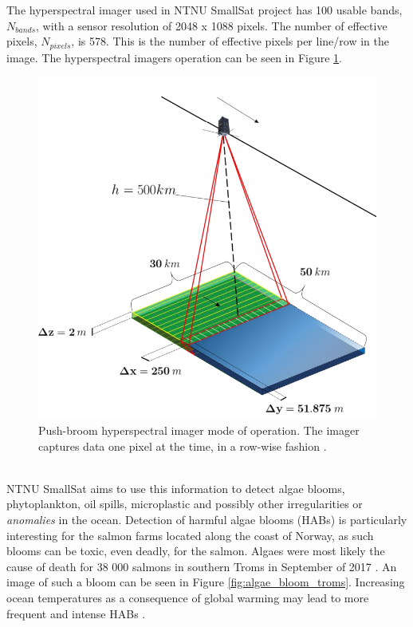 The hyperspectral imager used in NTNU SmallSat project has 100 usable bands, $N_{bands}$, with a sensor resolution of 2048 x 1088 pixels. The number of effective pixels, $N_{pixels}$, is 578. This is the number of effective pixels per line/row in the image. The hyperspectral imagers operation can be seen in Figure \ref{fig:HSI_functionality}. 
\begin{figure}[H]
\centering
   \includegraphics[scale=0.3]{images/hyperspectral_imager.PNG}
  \caption{ Push-broom hyperspectral imager mode of operation. The imager captures data one pixel at the time, in a row-wise fashion \cite{SmallSat_project_description}. } 
  \label{fig:HSI_functionality}
\end{figure}
\\

NTNU SmallSat aims to use this information to detect algae blooms, phytoplankton, oil spills, microplastic and possibly other irregularities or \textit{anomalies} in the ocean. Detection of harmful algae blooms (HABs) is particularly interesting for the salmon farms located along the coast of Norway, as such blooms can be toxic, even deadly, for the salmon. Algaes were most likely the cause of death for 38 000 salmons in southern Troms in September of 2017 \cite{laksedeath}. An image of such a bloom can be seen in Figure \ref{fig:algae_bloom_troms}. Increasing ocean temperatures as a consequence of global warming may lead to more frequent and intense HABs \cite{climate_change_algae_blooms}. 
\\

